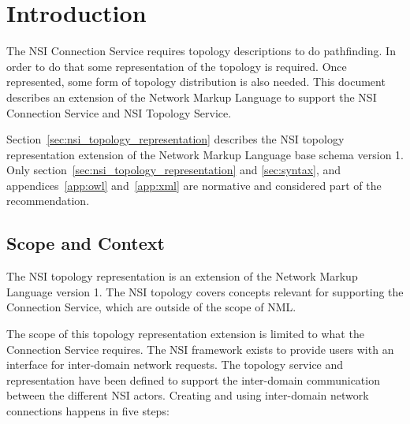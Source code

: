 \documentclass[12pt]{article}  %
\begin{document}
\tableofcontents

\newcommand{\qq}{\symbol{34}} %
\newcommand{\q}{\symbol{39}} %
\newcommand{\underscore}{\symbol{95}} %

\newcommand{\MUST}{\textsc{must}}
\newcommand{\MUSTNOT}{\textsc{must not}}
\newcommand{\REQUIRED}{\textsc{required}}
\newcommand{\SHALL}{\textsc{shall}}
\newcommand{\SHALLNOT}{\textsc{shall not}}
\newcommand{\SHOULD}{\textsc{should}}
\newcommand{\SHOULDNOT}{\textsc{should not}}
\newcommand{\RECOMMENDED}{\textsc{recommended}}
\newcommand{\MAY}{\textsc{may}}
\newcommand{\OPTIONAL}{\textsc{optional}}

\newpage

\section{Introduction}


 The NSI Connection Service requires topology descriptions to do 
pathfinding. In order to do that some representation of the topology is required. 
Once represented, some form of topology distribution is also needed. This document 
describes an extension of the Network Markup Language\cite{GFD.206} to support the NSI Connection Service\cite{gfd-nsi-connection} and NSI Topology Service\cite{gfd-nsi-topo-serv}.

Section~\ref{sec:nsi_topology_representation} describes the NSI topology representation extension of the Network Markup Language base schema version 1. Only section~\ref{sec:nsi_topology_representation} and \ref{sec:syntax}, and appendices~\ref{app:owl} and~\ref{app:xml} are normative and considered part of the recommendation.

\subsection{Scope and Context}

The NSI topology representation is an extension of the Network Markup Language version 1. The NSI topology covers concepts relevant for supporting the Connection Service, which are outside of the scope of NML.

The scope of this topology representation extension is limited to what the Connection Service requires.
The NSI framework exists to provide users with an interface for inter-domain network requests. The topology service and representation have been defined to support the inter-domain communication between the different NSI actors. Creating and using inter-domain network connections happens in five steps:
\end{document}
